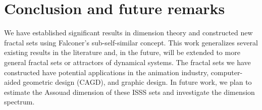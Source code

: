 \documentclass[12pt,oneside,reqno]{amsart}
\newtheorem{theorem}{Theorem}[section]
\theoremstyle{definition}
\theoremstyle{remark}
\newtheorem{note}[theorem]{Note}
\begin{document}
\section{Conclusion and future remarks}\label{section 8}
We have established significant results in dimension theory and constructed new fractal sets using Falconer's sub-self-similar concept. This work generalizes several existing results in the literature and, in the future, will be extended to more general fractal sets or attractors of dynamical systems. The fractal sets we have constructed have potential applications in the animation industry, computer-aided geometric design (CAGD), and graphic design. In future work, we plan to estimate the Assouad dimension of these ISSS sets and investigate the dimension spectrum.
\end{document}
